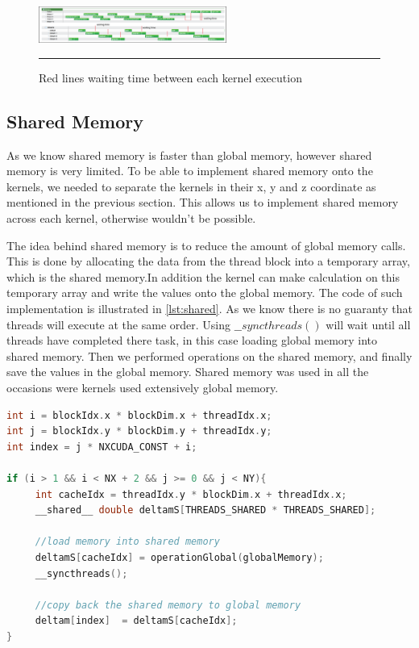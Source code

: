\begin{figure}[htbp]
	\centering
		\includegraphics[width=0.55\textwidth]{Figures/waittime.png}
		\rule{35em}{0.2pt}
	\caption[Waiting time concurrent kernels]{Red lines waiting time between each kernel execution
}
	\label{fig:waittime}
\end{figure}


\subsection{Shared Memory}

As we know shared memory is faster than global memory, however shared memory is very limited. To be able to implement shared memory onto the kernels, we needed to separate the kernels in their x, y and z coordinate as mentioned in the previous section. This allows us to implement shared memory across each kernel, otherwise wouldn't be possible.

The idea behind shared memory is to reduce the amount of global memory calls. This is done by allocating the data from the thread block into a temporary array, which is the shared memory.In addition the kernel can make calculation on this temporary array and write the values onto the global memory. The code of such implementation is illustrated in \ref{lst:shared}. As we know there is no guaranty that threads will execute at the same order. Using $\_\_syncthreads()$ will wait until all threads have completed there task, in this case loading global memory into shared memory. Then we performed operations on the shared memory, and finally save the values in the global memory. Shared memory was used in all the occasions were kernels used extensively global memory.

\begin{lstlisting}[language=C++, label={lst:shared}, caption={Shared memory}]
int i = blockIdx.x * blockDim.x + threadIdx.x;
int j = blockIdx.y * blockDim.y + threadIdx.y;
int index = j * NXCUDA_CONST + i;

if (i > 1 && i < NX + 2 && j >= 0 && j < NY){
     int cacheIdx = threadIdx.y * blockDim.x + threadIdx.x;
     __shared__ double deltamS[THREADS_SHARED * THREADS_SHARED];

	 //load memory into shared memory
     deltamS[cacheIdx] = operationGlobal(globalMemory);
     __syncthreads();

	 //copy back the shared memory to global memory
     deltam[index]  = deltamS[cacheIdx];
}
\end{lstlisting}

